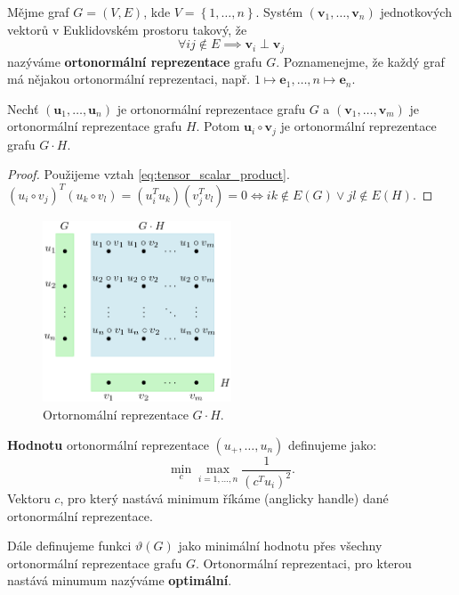 Mějme graf $G = (V,E)$, kde $V = \left\{ 1, \dots, n \right\}$. Systém $\left( \textbf{v}_1, \dots, \textbf{v}_n \right)$ jednotkových vektorů v Euklidovském prostoru takový, že
$$
    \forall ij \notin E \implies \textbf{v}_i \perp \textbf{v}_j
$$
nazýváme \textbf{ortonormální reprezentace} grafu $G$. Poznamenejme, že každý graf má nějakou ortonormální reprezentaci, např. $1 \mapsto \mathbf{e}_1, \dots, n \mapsto \mathbf{e}_n$.

\begin{lm}
    Nechť $\left( \mathbf{u}_1, \dots, \mathbf{u}_n \right)$ je ortonormální reprezentace grafu $G$ a $\left( \mathbf{v}_1, \dots, \mathbf{v}_m \right)$ je ortonormální reprezentace grafu $H$. Potom $\mathbf{u}_i \circ \mathbf{v}_j$ je ortonormální reprezentace grafu $G \cdot H$.
\end{lm}

\begin{proof}
    Použijeme vztah \ref{eq:tensor_scalar_product}. $\left( u_i \circ v_j \right)^T \left( u_k \circ v_l \right) = \left( u_i^T u_k \right) \left( v_j^T v_l \right) = 0 \iff ik \notin E(G) \vee jl \notin E(H)$.
\end{proof}

\begin{figure}[h!]
    \centering
    \includegraphics[width=0.5\textwidth]{img/shannon_lemma.png}   
    \caption{Ortornomální reprezentace $G \cdot H$.}
    \label{fig:orthonormal_repr_GH}
\end{figure}

\textbf{Hodnotu} ortonormální reprezentace $\left(u_+, \dots, u_n \right)$ definujeme jako:
$$
    \min_c \max_{i = 1, \dots, n} \frac{1}{\left( c^T u_i \right)^2}.
$$
Vektoru $c$, pro který nastává minimum říkáme \textbf{} (anglicky handle) dané ortonormální reprezentace.

Dále definujeme funkci $\vartheta(G)$ jako minimální hodnotu přes všechny ortonormální reprezentace grafu $G$. Ortonormální reprezentaci, pro kterou nastává minumum nazýváme \textbf{optimální}.

